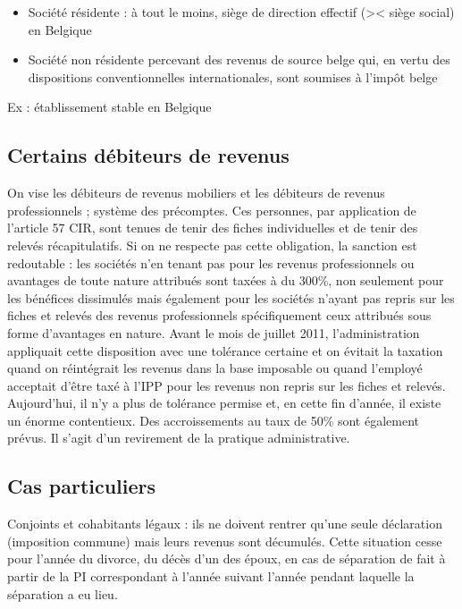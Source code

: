 \documentclass{book}
\begin{document}
\begin{itemize}
\item Société résidente : à tout le moins, siège de direction effectif (>< siège social) en Belgique 
\item Société non résidente percevant des revenus de source belge qui, en vertu des dispositions conventionnelles internationales, sont soumises à l’impôt belge
\end{itemize}

Ex : établissement stable en Belgique  

\subsection{Certains débiteurs de revenus}
 
On vise les débiteurs de revenus mobiliers et les débiteurs de revenus professionnels ; système des précomptes. 
Ces personnes, par application de l’article 57 CIR, sont tenues de tenir des fiches individuelles et de tenir 	des relevés récapitulatifs. Si on ne respecte pas cette obligation, la sanction est redoutable : les sociétés n’en tenant pas pour les revenus professionnels ou avantages de toute nature attribués sont taxées à du 300\%, non seulement pour les bénéfices dissimulés mais également pour les sociétés n’ayant pas repris sur les fiches et relevés des revenus professionnels spécifiquement ceux attribués sous forme d’avantages en nature. Avant le mois de juillet 2011, l’administration appliquait cette disposition avec une tolérance certaine et on évitait la taxation quand on réintégrait les revenus dans la base imposable ou quand l’employé acceptait d’être taxé à l’IPP pour les revenus non repris sur les fiches et relevés. Aujourd’hui, il n’y a plus de tolérance permise et, en cette fin d’année, il existe un énorme contentieux. Des accroissements au taux de 50\% sont également prévus. Il s’agit d’un revirement de la pratique administrative. 

\subsection{Cas particuliers}

Conjoints et cohabitants légaux : ils ne doivent rentrer qu’une seule déclaration (imposition commune) mais leurs revenus sont décumulés. Cette situation cesse pour l’année du divorce, du décès d’un des époux, en cas de séparation de fait à partir de la PI correspondant à l’année suivant l’année pendant laquelle la séparation a eu lieu. 
\end{document}
